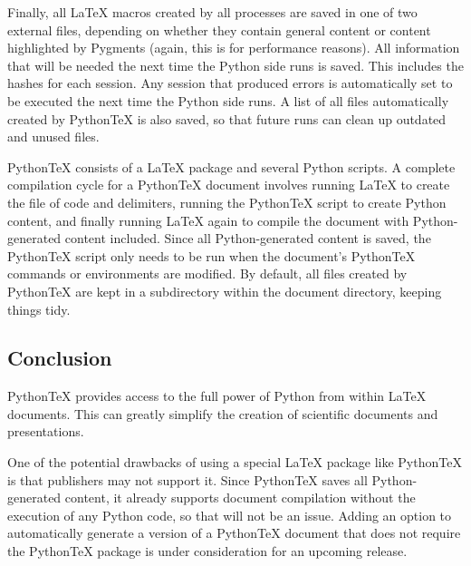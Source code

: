 \documentclass[letterpaper,compsoc,twoside]{IEEEtran}
\begin{document}
Finally, all LaTeX macros created by all processes are saved in
one of two external files, depending on whether they contain general
content or content highlighted by Pygments (again, this is for
performance reasons).  All information that will be needed the next
time the Python side runs is saved.  This includes the hashes for
each session.  Any session that produced errors is automatically set
to be executed the next time the Python side runs.  A list of all files
automatically created by PythonTeX is also saved, so that future runs can clean up
outdated and unused files.

PythonTeX consists of a LaTeX package and several Python scripts.
A complete compilation cycle for a PythonTeX document involves running
LaTeX to create the file of code and delimiters, running the PythonTeX
script to create Python content, and finally running LaTeX again
to compile the document with Python-generated content included.  Since
all Python-generated content is saved, the PythonTeX script only needs
to be run when the document's PythonTeX commands or environments are
modified.  By default, all files created by PythonTeX are kept in a
subdirectory within the document directory, keeping things tidy.

\subsection{Conclusion%
  \label{conclusion}%
}


PythonTeX provides access to the full power of Python from within
LaTeX documents.  This can greatly simplify the creation of scientific
documents and presentations.

One of the potential drawbacks of using a special LaTeX package
like PythonTeX is that publishers may not support it.  Since PythonTeX
saves all Python-generated content, it already supports document
compilation without the execution of any Python code, so that will
not be an issue.  Adding an option to automatically generate a version
of a PythonTeX document that does not require the PythonTeX package
is under consideration for an upcoming release.
\end{document}
